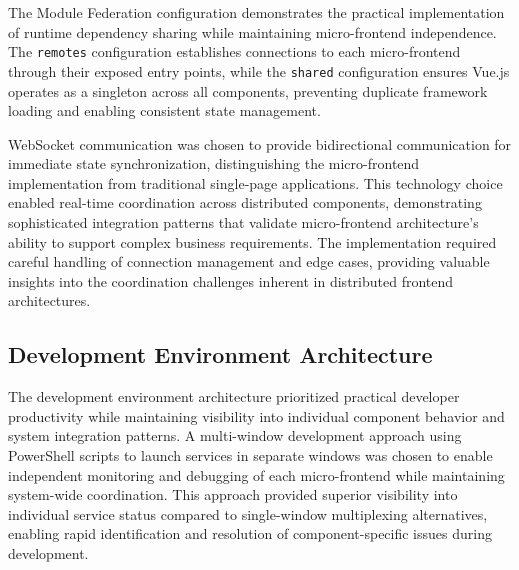\documentclass[12pt,a4paper]{report}
\begin{document}
The Module Federation configuration demonstrates the practical implementation of runtime dependency sharing while maintaining micro-frontend independence. The \texttt{remotes} configuration establishes connections to each micro-frontend through their exposed entry points, while the \texttt{shared} configuration ensures Vue.js operates as a singleton across all components, preventing duplicate framework loading and enabling consistent state management.

WebSocket communication was chosen to provide bidirectional communication for immediate state synchronization, distinguishing the micro-frontend implementation from traditional single-page applications. This technology choice enabled real-time coordination across distributed components, demonstrating sophisticated integration patterns that validate micro-frontend architecture's ability to support complex business requirements. The implementation required careful handling of connection management and edge cases, providing valuable insights into the coordination challenges inherent in distributed frontend architectures.

\subsection{Development Environment Architecture}

The development environment architecture prioritized practical developer productivity while maintaining visibility into individual component behavior and system integration patterns. A multi-window development approach using PowerShell scripts to launch services in separate windows was chosen to enable independent monitoring and debugging of each micro-frontend while maintaining system-wide coordination. This approach provided superior visibility into individual service status compared to single-window multiplexing alternatives, enabling rapid identification and resolution of component-specific issues during development.
\end{document}
